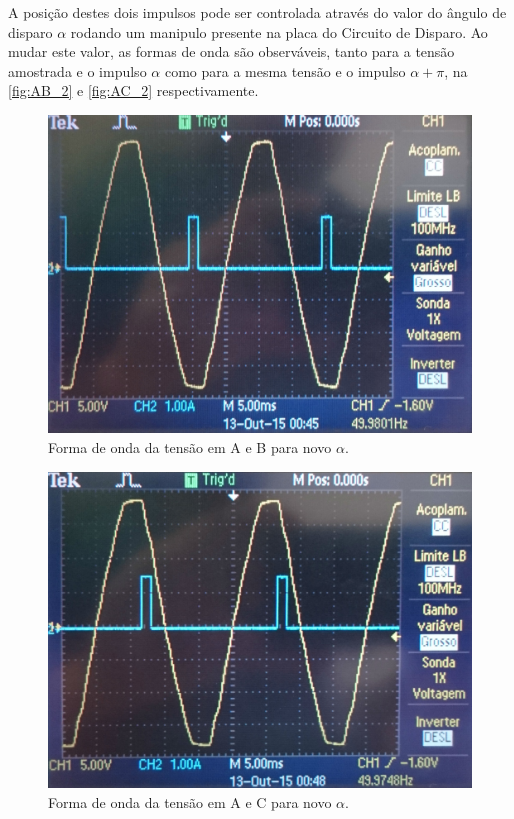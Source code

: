 \documentclass[a4paper,11pt]{article}
\numberwithin{equation}{section}
\begin{document}
A posição destes dois impulsos pode ser controlada através do valor do ângulo de disparo $\alpha$ rodando um manipulo presente na placa do Circuito de Disparo. Ao mudar este valor, as formas de onda são observáveis, tanto para a tensão amostrada e o impulso $\alpha$ como para a mesma tensão e o impulso  $\alpha + \pi$, na \autoref{fig:AB_2} e \autoref{fig:AC_2} respectivamente.

\begin{figure}[H]
	\centering
	\includegraphics[keepaspectratio=true, scale=0.11]{img/figs/AB_2}
	\caption{Forma de onda da tensão em A e B para novo $\alpha$.}
	\label{fig:AB_2}
	\vspace{-0.8em}
\end{figure}

\begin{figure}[H]
	\centering
	\includegraphics[keepaspectratio=true, scale=0.11]{img/figs/AC_2}
	\caption{Forma de onda da tensão em A e C para novo $\alpha$.}
	\label{fig:AC_2}
	\vspace{-0.8em}
\end{figure}
\end{document}
